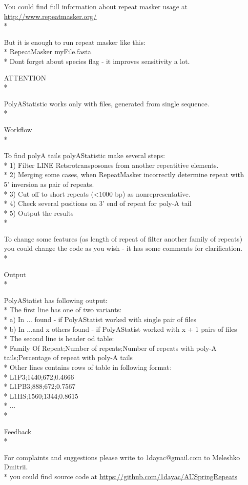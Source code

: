 \documentclass[12pt]{article}
\begin{document}
You could find full information about repeat masker usage at \href{http://www.repeatmasker.org/}{http://www.repeatmasker.org/}  \\*

But it is enough to run repeat masker like this: \\* 
RepeatMasker myFile.fasta \\*
Dont forget about species flag - it improves sensitivity a lot. 

\begin{Large}
ATTENTION \\*
\end{Large}
PolyAStatistic works only with files, generated from single sequence. \\*

\begin{Large}
Workflow \\*
\end{Large}
To find polyA tails polyAStatistic make several steps: \\*
1) Filter LINE Retsrotransposones from another repeatitive elements. \\*
2) Merging some cases, when RepeatMasker incorrectly determine repeat with 5' inversion as pair of repeats. \\*
3) Cut off to short repeats (<1000 bp) as nonrepresentative. \\*
4) Check several positions on 3' end of repeat for poly-A tail \\*
5) Output the results \\*

To change some features (as length of repeat of filter another family of repeats) you could change the code as you wish - it has some comments for clarification. \\*

\begin{Large}
Output \\*
\end{Large}
PolyAStatist has following output: \\*
The first line has one of two variants: \\*
a) In ... found - if PolyAStatist worked with single pair of files \\*
b) In ...and x others found - if PolyAStatist worked with x + 1 pairs of files \\*
The second line is header od table: \\*
Family Of Repeat;Number of repeats;Number of repeats with poly-A tails;Percentage of repeat with poly-A tails \\*
Other lines contains rows of table in following format: \\*
L1P3;1440;672;0.4666\\*
L1PB3;888;672;0.7567\\*
L1HS;1560;1344;0.8615\\*
...\\*

\begin{Large}
Feedback\\*
\end{Large}
For complaints and suggestions please write to 1dayac@gmail.com to Meleshko Dmitrii.\\*
you could find source code at \href{https://github.com/1dayac/AUSpringRepeats}{https://github.com/1dayac/AUSpringRepeats}
\end{document}
